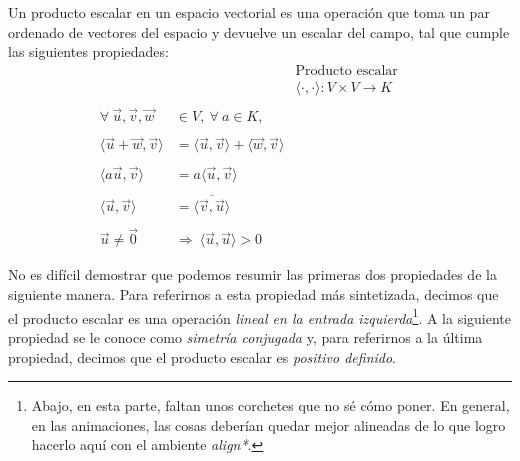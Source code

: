 \documentclass[12pt,dvipsnames]{article}
\numberwithin{equation}{section}
\begin{document}
Un producto escalar en un espacio vectorial es una operación que toma un par ordenado de vectores del espacio y devuelve un escalar del campo, tal que cumple las siguientes propiedades:
\begin{align*}
    & &\text{Producto escalar}& &\\
    & &\langle\cdot,\cdot\rangle:V\times V\to K & &\\
    \\
    \forall \ \vec{u}, \vec{v}, \vec{w}&\in V, \ \forall \ a\in K,\\
    \\
    \langle\vec{u}+\vec{w},\vec{v}\rangle &= \langle \vec{u} , \vec{v} \rangle + \langle \vec{w} , \vec{v} \rangle \\
    \\
    \langle a\vec{u} , \vec{v} \rangle &= a \langle \vec{u} , \vec{v} \rangle\\
    \\
    \langle \vec{u} , \vec{v} \rangle &= \overline{ \langle \vec{v} , \vec{u} \rangle}\\
    \\
    \vec{u}\neq\vec{0} \ &\Rightarrow \ \langle \vec{u}, \vec{u} \rangle > 0
\end{align*}

\noindent No es difícil demostrar que podemos resumir las primeras dos propiedades de la siguiente manera. Para referirnos a esta propiedad más sintetizada, decimos que el producto escalar es una operación \emph{lineal en la entrada izquierda}\footnote{Abajo, en esta parte, faltan unos corchetes que no sé cómo poner. En general, en las animaciones, las cosas deberían quedar mejor alineadas de lo que logro hacerlo aquí con el ambiente \emph{align*}.}. A la siguiente propiedad se le conoce como \emph{simetría conjugada} y, para referirnos a la última propiedad, decimos que el producto escalar es \emph{positivo definido}.
\end{document}
